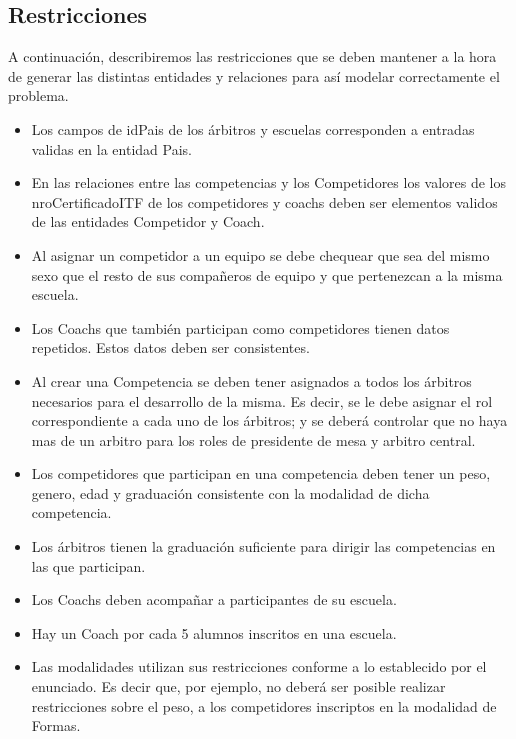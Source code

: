 \subsection{Restricciones}

A continuación, describiremos las restricciones que se deben mantener a la hora de generar las distintas entidades y relaciones para así modelar correctamente el problema.

\begin{itemize}
\item Los campos de idPais de los árbitros y escuelas corresponden a entradas validas en la entidad Pais.
\item En las relaciones entre las competencias y los Competidores los valores de los nroCertificadoITF de los competidores y coachs deben ser elementos validos de las entidades Competidor y Coach.
\item Al asignar un competidor a un equipo se debe chequear que sea del mismo sexo que el resto de sus compañeros de equipo y que pertenezcan a la misma escuela.
\item Los Coachs que también participan como competidores tienen datos repetidos. Estos datos deben ser consistentes.
\item Al crear una Competencia se deben tener asignados a todos los árbitros necesarios para el desarrollo de la misma. Es decir, se le debe asignar el rol correspondiente a cada uno de los árbitros; y se deberá controlar que no haya mas de un arbitro para los roles de presidente de mesa y arbitro central.
\item Los competidores que participan en una competencia deben tener un peso, genero, edad y graduación consistente con la modalidad de dicha competencia.
\item Los árbitros tienen la graduación suficiente para dirigir las competencias en las que participan.
\item Los Coachs deben acompañar a participantes de su escuela.
\item Hay un Coach por cada 5 alumnos inscritos en una escuela.
\item Las modalidades utilizan sus restricciones conforme a lo establecido por el enunciado. Es decir que, por ejemplo, no deberá ser posible realizar restricciones sobre el peso, a los competidores inscriptos en la modalidad de Formas. 
\end{itemize}
